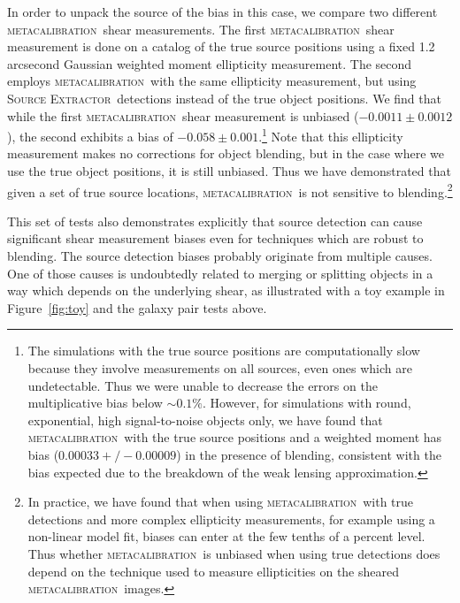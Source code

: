 \documentclass[fleqn,useAMS,usenatbib]{mnras}
\newcommand{\mcal}{\textsc{metacalibration}}
\newcommand{\sx}{\textsc{Source Extractor}}
\begin{document}
In order to unpack the source of the bias in this case, we compare two
different \mcal\ shear measurements. The first \mcal\ shear measurement is done
on a catalog of the true source positions using a fixed 1.2 arcsecond Gaussian
weighted moment ellipticity measurement. The second employs \mcal\ with the
same ellipticity measurement, but using \sx\ detections instead of the true
object positions. We find that while the first \mcal\ shear measurement is
unbiased ($-0.0011\pm0.0012$), the second exhibits a bias of
$-0.058\pm0.001$.\footnote{The simulations with the true source positions are
computationally slow because they involve measurements on all sources, even
ones which are undetectable. Thus we were unable to decrease the errors on the
multiplicative bias below $\sim0.1\%$. However, for simulations with round,
exponential, high signal-to-noise objects only, we have found that \mcal\ with
the true source positions and a weighted moment has bias ($0.00033 +/-
0.00009$) in the presence of blending, consistent with the bias expected due to
the breakdown of the weak lensing approximation.} Note that this ellipticity
measurement makes no corrections for object blending, but in the case where we
use the true object positions, it is still unbiased. Thus we have demonstrated
that given a set of true source locations, \mcal\ is not sensitive to
blending.\footnote{In practice, we have found that when using \mcal\ with true
detections and more complex ellipticity measurements, for example using a
non-linear model fit, biases can enter at the few tenths of a percent level. Thus
whether \mcal\ is unbiased when using true detections 
does depend on the technique used to measure ellipticities on the
sheared \mcal\ images.}

This set of tests also demonstrates explicitly that source detection can cause
significant shear measurement biases even for techniques which are robust to
blending. The source detection biases probably originate from multiple causes.
One of those causes is undoubtedly related to merging or splitting objects in a
way which depends on the underlying shear, as illustrated with a toy example in
Figure~\ref{fig:toy} and the galaxy pair tests above.

\end{document}
